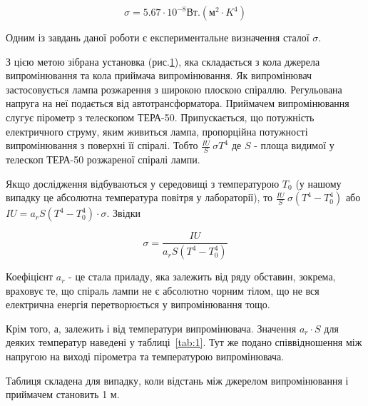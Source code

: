 \documentclass[twocolumn]{el-author}
\begin{document}
\begin{equation} \label{eq:Stefan_Boltzmann_const}
\sigma = 5.67 \cdot 10^{-8} Вт.(м^{2} \cdot K^{4})
\end{equation}

Одним із завдань даної роботи є експериментальне визначення сталої $\sigma$.

\begin{figure}[ht]
\caption{\source{}}
\label{img:1}
\end{figure}

З цією метою зібрана установка (рис.\ref{img:1}), яка складається з кола джерела
випромінювання та кола приймача випромінювання. Як випромінювач
застосовується лампа розжарення з широкою плоскою спіраллю. Регульована
напруга на неї подається від  автотрансформатора.  Приймачем
випромінювання слугує пірометр з телескопом ТЕРА-50. Припускається, що
потужність електричного струму, яким живиться лампа, пропорційна
потужності випромінювання з поверхні її спіралі. 
Тобто $\frac{IU}{S} ~ \sigma T^{4}$ 
де $S$ - площа видимої у телескоп ТЕРА-50 розжареної спіралі лампи.

Якщо дослідження відбуваються у середовищі з температурою $T_{0}$
(у нашому випадку це абсолютна температура повітря у лабораторії), то
$\frac{IU}{S} ~ \sigma(T^{4} - T_{0}^{4})$ або 
$IU = a_{r}S (T^{4} - T_{0}^{4}) \cdot \sigma$. Звідки

\begin{equation} \label{eq:1}
\sigma = \frac{IU}{a_{r}S(T^{4} - T_{0}^{4})}
\end{equation}

Коефіцієнт $a_{r}$ - це стала приладу, яка залежить від ряду обставин, зокрема,
враховує те, що спіраль лампи не є абсолютно чорним тілом, що не вся
електрична енергія перетворюється у випромінювання тощо.

Крім того, а, залежить і від температури випромінювача. Значення $a_{r} \cdot S$
для деяких температур наведені у таблиці~\ref{tab:1}. Тут же подано співвідношення
між напругою на виході пірометра та температурою випромінювача.

Таблиця складена для випадку, коли відстань між джерелом
випромінювання і приймачем становить 1 м.
\end{document}
